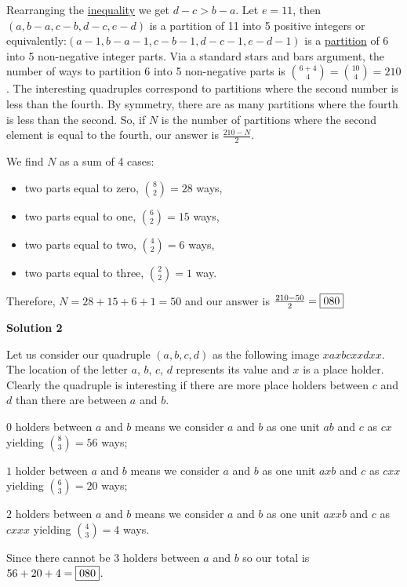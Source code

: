 \begin{enumerate}
Rearranging the \href{https://artofproblemsolving.com/wiki/index.php?title=Inequality}{inequality} we get $d-c > b-a$. Let $e = 11$, then $(a, b-a, c-b, d-c, e-d)$ is a partition of 11 into 5 positive integers or equivalently:$(a-1, b-a-1, c-b-1, d-c-1, e-d-1)$ is a \href{https://artofproblemsolving.com/wiki/index.php?title=Partition}{partition} of 6 into 5 non-negative integer parts. Via a standard stars and bars argument, the number of ways to partition 6 into 5 non-negative parts is $\binom{6+4}4 = \binom{10}4 = 210$. The interesting quadruples correspond to partitions where the second number is less than the fourth. By symmetry, there are as many partitions where the fourth is less than the second. So, if $N$ is the number of partitions where the second element is equal to the fourth, our answer is $\frac{210-N}{2}$.

 We find $N$ as a sum of 4 cases:

 
            \begin{itemize}
        \item two parts equal to zero, $\binom82 = 28$ ways,
        \item two parts equal to one, $\binom62 = 15$ ways,
        \item two parts equal to two, $\binom42 = 6$ ways,
        \item two parts equal to three, $\binom22 = 1$ way.
            \end{itemize}
            Therefore, $N = 28 + 15 + 6 + 1 = 50$ and our answer is $\frac{210 - 50}{2} = \fbox{080}$




\textbf{Solution 2}

Let us consider our quadruple $(a,b,c,d)$ as the following image $xaxbcxxdxx$. The location of the letter $a$, $b$, $c$, $d$ represents its value and $x$ is a place holder. Clearly the quadruple is interesting if there are more place holders between $c$ and $d$ than there are between $a$ and $b$. 

 $0$ holders between $a$ and $b$ means we consider $a$ and $b$ as one unit $ab$ and $c$ as $cx$ yielding $\binom83 = 56$ ways; 

 $1$ holder between $a$ and $b$ means we consider $a$ and $b$ as one unit $axb$ and $c$ as $cxx$ yielding $\binom 63 = 20$ ways; 

 $2$ holders between $a$ and $b$ means we consider $a$ and $b$ as one unit $axxb$ and $c$ as $cxxx$ yielding $\binom43 = 4$ ways.

 Since there cannot be $3$ holders between $a$ and $b$ so our total is $56+20+4=\fbox{080}$.


\end{enumerate}
